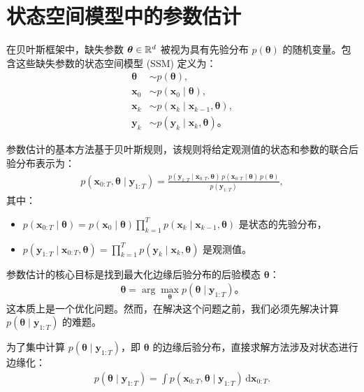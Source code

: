 \section{状态空间模型中的参数估计}
在贝叶斯框架中，缺失参数 \(\boldsymbol{\theta} \in \mathbb{R}^d\) 被视为具有先验分布 \(p(\boldsymbol{\theta})\) 的随机变量。包含这些缺失参数的状态空间模型 (SSM) 定义为：
\begin{align}
\boldsymbol{\theta} &\sim p(\boldsymbol{\theta}), \\
\mathbf{x}_0 &\sim p(\mathbf{x}_0 \mid \boldsymbol{\theta}), \\
\mathbf{x}_k &\sim p(\mathbf{x}_k \mid \mathbf{x}_{k-1}, \boldsymbol{\theta}), \\
\mathbf{y}_k &\sim p(\mathbf{y}_k \mid \mathbf{x}_k, \boldsymbol{\theta})。
\end{align}

参数估计的基本方法基于贝叶斯规则，该规则将给定观测值的状态和参数的联合后验分布表示为：
\begin{align}
p(\mathbf{x}_{0:T}, \boldsymbol{\theta} \mid \mathbf{y}_{1:T}) = \frac{p(\mathbf{y}_{1:T} \mid \mathbf{x}_{0:T}, \boldsymbol{\theta}) \, p(\mathbf{x}_{0:T} \mid \boldsymbol{\theta}) \, p(\boldsymbol{\theta})}{p(\mathbf{y}_{1:T})},
\end{align}
其中：
\begin{itemize}
\item \(p(\mathbf{x}_{0:T} \mid \boldsymbol{\theta}) = p(\mathbf{x}_0 \mid \boldsymbol{\theta}) \prod_{k=1}^{T} p(\mathbf{x}_k \mid \mathbf{x}_{k-1}, \boldsymbol{\theta})\) 是状态的先验分布，
\item \(p(\mathbf{y}_{1:T} \mid \mathbf{x}_{0:T}, \boldsymbol{\theta}) = \prod_{k=1}^{T} p(\mathbf{y}_k \mid \mathbf{x}_k, \boldsymbol{\theta})\) 是观测值。
\end{itemize}

参数估计的核心目标是找到最大化边缘后验分布的后验模态 \(\boldsymbol{\theta}\)：
\begin{align}
\boldsymbol{\theta} = \arg \max_{\boldsymbol{\theta}} p(\boldsymbol{\theta} \mid \mathbf{y}_{1:T})。
\end{align}
这本质上是一个优化问题。然而，在解决这个问题之前，我们必须先解决计算 \(p(\boldsymbol{\theta} \mid \mathbf{y}_{1:T})\) 的难题。

为了集中计算 \(p(\boldsymbol{\theta} \mid \mathbf{y}_{1:T})\)，即 \(\boldsymbol{\theta}\) 的边缘后验分布，直接求解方法涉及对状态进行边缘化：
\begin{align}
p(\boldsymbol{\theta} \mid \mathbf{y}_{1:T}) = \int p(\mathbf{x}_{0:T}, \boldsymbol{\theta} \mid \mathbf{y}_{1:T}) \, \mathrm{d} \mathbf{x}_{0:T}.
\end{align}

